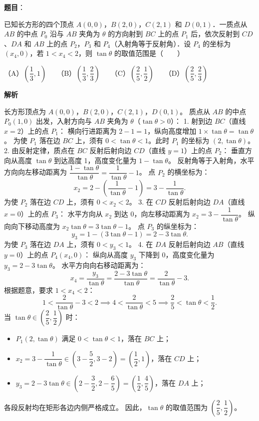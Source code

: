 \begin{answer}

\textbf{题目}：

已知长方形的四个顶点 $A(0, 0)$，$B(2, 0)$，$C(2, 1)$ 和 $D(0, 1)$．一质点从 $AB$ 的中点 $P_0$ 沿与 $AB$ 夹角为 $\theta$ 的方向射到 $BC$ 上的点 $P_1$ 后，依次反射到 $CD$、$DA$ 和 $AB$ 上的点 $P_2$，$P_3$ 和 $P_4$（入射角等于反射角）．设 $P_4$ 的坐标为 $(x_4, 0)$，若 $1 < x_4 < 2$，则 $\tan\theta$ 的取值范围是\mbox{（　　）}

（A）$\left(\dfrac{1}{3}, 1\right)$　　（B）$\left(\dfrac{1}{3}, \dfrac{2}{3}\right)$　　（C）$\left(\dfrac{2}{5}, \dfrac{1}{2}\right)$　　（D）$\left(\dfrac{2}{5}, \dfrac{2}{3}\right)$

\textbf{解析}

长方形顶点为 $A(0, 0)$，$B(2, 0)$，$C(2, 1)$，$D(0, 1)$。
质点从 $AB$ 的中点 $P_0(1, 0)$ 出发，入射方向与 $AB$ 夹角为 $\theta$（$\tan\theta > 0$）：
1. 射到边 $BC$（直线 $x = 2$）上的点 $P_1$：
   横向行进距离为 $2 - 1 = 1$，纵向高度增加 $1 \times \tan\theta = \tan\theta$。
   为使 $P_1$ 落在边 $BC$ 上，须有 $0 < \tan\theta < 1$。此时 $P_1$ 的坐标为 $(2, \tan\theta)$。
2. 由反射定律，质点在 $BC$ 反射后射向边 $CD$（直线 $y = 1$）上的点 $P_2$：
   垂直方向从高度 $\tan\theta$ 到达高度 1，高度变化量为 $1 - \tan\theta$。
   反射角等于入射角，水平方向向左移动距离为 $\dfrac{1 - \tan\theta}{\tan\theta} = \dfrac{1}{\tan\theta} - 1$。
   点 $P_2$ 的横坐标为：
\nopagebreak[4]
\[x_2 = 2 - \left(\frac{1}{\tan\theta} - 1\right) = 3 - \frac{1}{\tan\theta}.\]
   为使 $P_2$ 落在边 $CD$ 上，须有 $0 < x_2 < 2$。
3. 在 $CD$ 反射后射向边 $DA$（直线 $x = 0$）上的点 $P_3$：
   水平方向从 $x_2$ 到达 $0$，向左移动距离为 $x_2 = 3 - \dfrac{1}{\tan\theta}$。
   纵向向下移动高度为 $x_2 \tan\theta = 3\tan\theta - 1$。
   点 $P_3$ 的纵坐标为：
\nopagebreak[4]
\[y_3 = 1 - (3\tan\theta - 1) = 2 - 3\tan\theta.\]
   为使 $P_3$ 落在边 $DA$ 上，须有 $0 < y_3 < 1$。
4. 在 $DA$ 反射后射向边 $AB$（直线 $y = 0$）上的点 $P_4(x_4, 0)$：
   纵向从高度 $y_3$ 下降到 0，高度变化量为 $y_3 = 2 - 3\tan\theta$。
   水平方向向右移动距离为：
\nopagebreak[4]
\[x_4 = \frac{y_3}{\tan\theta} = \frac{2 - 3\tan\theta}{\tan\theta} = \frac{2}{\tan\theta} - 3.\]
根据题意，要求 $1 < x_4 < 2$：
\nopagebreak[4]
\[1 < \frac{2}{\tan\theta} - 3 < 2 \implies 4 < \frac{2}{\tan\theta} < 5 \implies \frac{2}{5} < \tan\theta < \frac{1}{2}.\]
当 $\tan\theta \in \left(\dfrac{2}{5}, \dfrac{1}{2}\right)$ 时：
\begin{itemize}
\item $P_1(2, \tan\theta)$ 满足 $0 < \tan\theta < 1$，落在 $BC$ 上；
\item $x_2 = 3 - \dfrac{1}{\tan\theta} \in (3 - \dfrac{5}{2}, 3 - 2) = \left(\dfrac{1}{2}, 1\right)$，落在 $CD$ 上；
\item $y_3 = 2 - 3\tan\theta \in \left(2 - \dfrac{3}{2}, 2 - \dfrac{6}{5}\right) = \left(\dfrac{1}{2}, \dfrac{4}{5}\right)$，落在 $DA$ 上；
\end{itemize}
各段反射均在矩形各边内侧严格成立。
因此，$\tan\theta$ 的取值范围为 $\left(\dfrac{2}{5}, \dfrac{1}{2}\right)$。


\end{answer}
